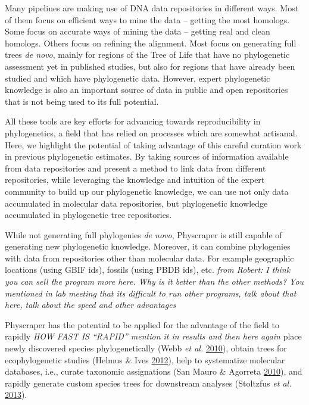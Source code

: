 \documentclass[]{article}
\begin{document}
Many pipelines are making use of DNA data repositories in different ways.
Most of them focus on efficient ways to mine the data -- getting the most homologs.
Some focus on accurate ways of mining the data -- getting real and clean homologs.
Others focus on refining the alignment.
Most focus on generating full trees \emph{de novo}, mainly for regions of the Tree of
Life that have no phylogenetic assessment yet in published studies, but also for
regions that have already been studied and which have phylogenetic data.
However, expert phylogenetic knowledge is also an important source of data in public
and open repositories that is not being used to its full potential.

All these tools are key efforts for advancing towards reproducibility in phylogenetics,
a field that has relied on processes which are somewhat artisanal.
Here, we highlight the potential of taking advantage of this careful curation work in previous phylogenetic estimates. By taking sources of information available from data repositories and present a method to link data from different repositories, while leveraging the knowledge and intuition of the expert
community to build up our phylogenetic knowledge, we can use not only data accumulated in
molecular data repositories, but phylogenetic knowledge accumulated in phylogenetic tree repositories.

While not generating full phylogenies \emph{de novo}, Physcraper is still capable of generating new phylogenetic knowledge.
Moreover, it can combine phylogenies with data from repositories other than molecular data. For example geographic locations (using GBIF ids), fossils (using PBDB ids), etc. \emph{from Robert: I think you can sell the program more here. Why is it better than the other methods? You mentioned in lab meeting that its difficult to run other programs, talk about that here, talk about the speed and other advantages}

Physcraper has the potential to be applied for the advantage of the field to rapidly \emph{HOW FAST IS ``RAPID'' mention it in results and then here again}
place newly discovered species phylogenetically (Webb \emph{et al.} \protect\hyperlink{ref-webb2010biodiversity}{2010}),
obtain trees for ecophylogenetic studies (Helmus \& Ives \protect\hyperlink{ref-helmus2012phylogenetic}{2012}),
help to systematize molecular databases, i.e., curate taxonomic assignations (San Mauro \& Agorreta \protect\hyperlink{ref-san2010molecular}{2010}),
and rapidly generate custom species trees for downstream analyses (Stoltzfus \emph{et al.} \protect\hyperlink{ref-stoltzfus2013phylotastic}{2013}).
\end{document}

